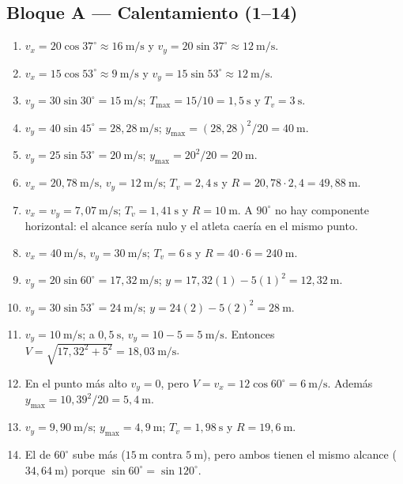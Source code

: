 \documentclass[12pt, letterpaper]{article}
\providecommand{\sen}{\sin}
\begin{document}
\subsection*{Bloque A — Calentamiento (1--14)}
\begin{enumerate}[leftmargin=*, label=\textbf{\arabic*.}]
  \item $v_x=20\cos37^\circ\approx16\ \text{m/s}$ y
        $v_y=20\sen37^\circ\approx12\ \text{m/s}$.
  \item $v_x=15\cos53^\circ\approx9\ \text{m/s}$ y
        $v_y=15\sen53^\circ\approx12\ \text{m/s}$.
  \item $v_y=30\sen30^\circ=15\ \text{m/s}$;
        $T_{\max}=15/10=1{,}5\ \text{s}$ y $T_v=3\ \text{s}$.
  \item $v_y=40\sen45^\circ=28{,}28\ \text{m/s}$;
        $y_{\max}=(28{,}28)^2/20=40\ \text{m}$.
  \item $v_y=25\sen53^\circ=20\ \text{m/s}$;
        $y_{\max}=20^2/20=20\ \text{m}$.
  \item $v_x=20{,}78\ \text{m/s}$, $v_y=12\ \text{m/s}$; $T_v=2{,}4\ \text{s}$
        y $R=20{,}78\cdot2{,}4=49{,}88\ \text{m}$.
  \item $v_x=v_y=7{,}07\ \text{m/s}$; $T_v=1{,}41\ \text{s}$ y
        $R=10\ \text{m}$. A $90^\circ$ no hay componente horizontal: el
        alcance sería nulo y el atleta caería en el mismo punto.
  \item $v_x=40\ \text{m/s}$, $v_y=30\ \text{m/s}$; $T_v=6\ \text{s}$ y
        $R=40\cdot6=240\ \text{m}$.
  \item $v_y=20\sen60^\circ=17{,}32\ \text{m/s}$;
        $y=17{,}32(1)-5(1)^2=12{,}32\ \text{m}$.
  \item $v_y=30\sen53^\circ=24\ \text{m/s}$;
        $y=24(2)-5(2)^2=28\ \text{m}$.
  \item $v_y=10\ \text{m/s}$; a $0{,}5\ \text{s}$,
        $v_y=10-5=5\ \text{m/s}$. Entonces
        $V=\sqrt{17{,}32^2+5^2}=18{,}03\ \text{m/s}$.
  \item En el punto más alto $v_y=0$, pero
        $V=v_x=12\cos60^\circ=6\ \text{m/s}$. Además
        $y_{\max}=10{,}39^2/20=5{,}4\ \text{m}$.
  \item $v_y=9{,}90\ \text{m/s}$; $y_{\max}=4{,}9\ \text{m}$;
        $T_v=1{,}98\ \text{s}$ y $R=19{,}6\ \text{m}$.
  \item El de $60^\circ$ sube más ($15\ \text{m}$ contra $5\ \text{m}$), pero
        ambos tienen el mismo alcance ($34{,}64\ \text{m}$) porque
        $\sen60^\circ=\sen120^\circ$.
\end{enumerate}
\end{document}
